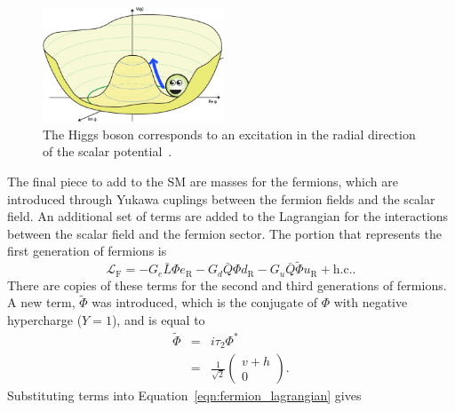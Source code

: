 \begin{figure}[ht]
  \centering
  \includegraphics[width=0.48\textwidth]{figs/theory/Higgs-Potential-radial.png}
  \caption{The Higgs boson corresponds to an excitation in the radial direction
    of the scalar potential~\cite{QuantumDiariesHiggs}.
  }
  \label{fig:higgs_mass}
\end{figure}

The final piece to add to the SM are masses for the fermions, which are
introduced through Yukawa cuplings between the fermion fields and the scalar
field.
An additional set of terms are added to the Lagrangian for the interactions
between the scalar field and the fermion sector.
The portion that represents the first generation of fermions is
\begin{equation}
  \mathcal{L}_\mathrm{F} =
  - G_e \bar{L} \Phi e_\mathrm{R}
  - G_d \bar{Q} \Phi d_\mathrm{R}
  - G_u \bar{Q} \tilde{\Phi} u_\mathrm{R}
  + \mathrm{h.c.}.
  \label{eqn:fermion_lagrangian}
\end{equation}
There are copies of these terms for the second and third generations of
fermions.
A new term, $\tilde{\Phi}$ was introduced, which is the conjugate of $\Phi$
with negative hypercharge ($Y = 1$), and is equal to
\begin{eqnarray}
  \tilde{\Phi} &=& i \tau_2 \Phi^{*} \\
               &=& \frac{1}{\sqrt{2}} \begin{pmatrix} v + h \\ 0 \end{pmatrix}.
\end{eqnarray}
Substituting terms into Equation~\ref{eqn:fermion_lagrangian} gives
